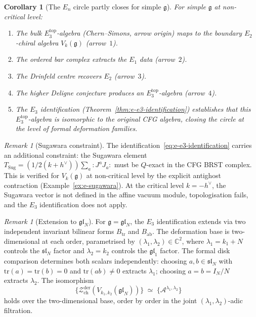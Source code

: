 \documentclass[11pt,reqno]{amsart}
\newtheorem{corollary}[theorem]{Corollary}
\theoremstyle{definition}
\theoremstyle{remark}
\newtheorem{remark}[theorem]{Remark}
\providecommand{\cA}{\mathcal{A}}
\providecommand{\cZ}{\mathcal{Z}}
\providecommand{\fg}{\mathfrak{g}}
\providecommand{\Eone}{E_1}
\providecommand{\Etwo}{E_2}
\providecommand{\Ethree}{E_3}
\providecommand{\En}{E_n}
\providecommand{\bC}{\mathbb{C}}
\begin{document}
\begin{corollary}[The $\En$ circle partly closes for simple $\fg$]
\label{cor:e-circle-partly-closes}
For simple $\fg$ at non-critical level:
\begin{enumerate}[label=\textup{(\roman*)}]
\item The bulk $\Ethree^{\mathrm{top}}$-algebra
 \textup{(}Chern--Simons, arrow origin\textup{)} maps to the
 boundary $\Etwo$-chiral algebra $V_k(\fg)$
 \textup{(}arrow~$1$\textup{)}.
\item The ordered bar complex extracts the $\Eone$ data
 \textup{(}arrow~$2$\textup{)}.
\item The Drinfeld centre recovers $\Etwo$
 \textup{(}arrow~$3$\textup{)}.
\item The higher Deligne conjecture produces an
 $\Ethree^{\mathrm{top}}$-algebra
 \textup{(}arrow~$4$\textup{)}.
\item The $\Ethree$ identification
 \textup{(}Theorem~\ref{thm:e-e3-identification}\textup{)}
 establishes that this $\Ethree^{\mathrm{top}}$-algebra
 is isomorphic to the original CFG algebra, closing the
 circle at the level of formal deformation families.
\end{enumerate}
\end{corollary}

\begin{remark}[Sugawara constraint]
\label{rem:e-sugawara-constraint}
The identification~\eqref{eq:e-e3-identification} carries
an additional constraint: the Sugawara element
$T_{\mathrm{Sug}} = (1/2(k+h^\vee))\sum_a{:}J^aJ_a{:}$
must be $Q$-exact in the CFG BRST complex. This is verified
for $V_k(\fg)$ at non-critical level by the explicit
antighost contraction
(Example~\ref{ex:e-sugawara}). At the critical level
$k = -h^\vee$, the Sugawara vector is not defined in the affine vacuum
module, topologisation fails, and the $\Ethree$ identification does
not apply.
\end{remark}

\begin{remark}[Extension to $\mathfrak{gl}_N$]
\label{rem:e-gl-n-extension}
For $\fg = \mathfrak{gl}_N$, the $\Ethree$ identification
extends via two independent invariant bilinear forms
$B_{\mathrm{tr}}$ and $B_{\mathrm{ab}}$. The deformation
base is two-dimensional at each order, parametrised by
$(\lambda_1, \lambda_2) \in \bC^2$, where
$\lambda_1 = k_1 + N$ controls the $\mathfrak{sl}_N$ factor
and $\lambda_2 = k_2$ controls the $\mathfrak{gl}_1$ factor.
The formal disk comparison determines both scalars
independently: choosing $a, b \in \mathfrak{sl}_N$ with
$\mathrm{tr}(a) = \mathrm{tr}(b) = 0$ and
$\mathrm{tr}(ab) \neq 0$ extracts $\lambda_1$; choosing
$a = b = I_N/N$ extracts $\lambda_2$. The isomorphism
\[
\bigl\{
\cZ^{\mathrm{der}}_{\mathrm{ch}}(V_{k_1,k_2}(\mathfrak{gl}_N))
\bigr\}
\;\simeq\;
\bigl\{
\cA^{\lambda_1,\lambda_2}
\bigr\}
\]
holds over the two-dimensional base, order by order in the
joint $(\lambda_1,\lambda_2)$-adic filtration.
\end{remark}
\end{document}
